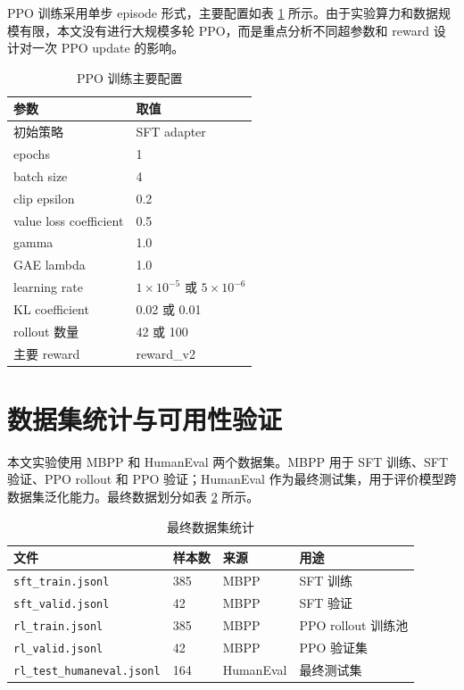 PPO 训练采用单步 episode 形式，主要配置如表 \ref{tab:ppo-config} 所示。由于实验算力和数据规模有限，本文没有进行大规模多轮 PPO，而是重点分析不同超参数和 reward 设计对一次 PPO update 的影响。

\begin{table}[!htp]
  \centering
  \caption{PPO 训练主要配置}
  \label{tab:ppo-config}
  \begin{tabular}{ll}
    \toprule
    参数 & 取值 \\
    \midrule
    初始策略 & SFT adapter \\
    epochs & 1 \\
    batch size & 4 \\
    clip epsilon & 0.2 \\
    value loss coefficient & 0.5 \\
    gamma & 1.0 \\
    GAE lambda & 1.0 \\
    learning rate & $1\times10^{-5}$ 或 $5\times10^{-6}$ \\
    KL coefficient & 0.02 或 0.01 \\
    rollout 数量 & 42 或 100 \\
    主要 reward & reward\_v2 \\
    \bottomrule
  \end{tabular}
\end{table}

\section{数据集统计与可用性验证}

本文实验使用 MBPP 和 HumanEval 两个数据集。MBPP 用于 SFT 训练、SFT 验证、PPO rollout 和 PPO 验证；HumanEval 作为最终测试集，用于评价模型跨数据集泛化能力。最终数据划分如表 \ref{tab:dataset-stat} 所示。

\begin{table}[!htp]
  \centering
  \caption{最终数据集统计}
  \label{tab:dataset-stat}
  \begin{tabular}{llll}
    \toprule
    文件 & 样本数 & 来源 & 用途 \\
    \midrule
    \texttt{sft\_train.jsonl} & 385 & MBPP & SFT 训练 \\
    \texttt{sft\_valid.jsonl} & 42 & MBPP & SFT 验证 \\
    \texttt{rl\_train.jsonl} & 385 & MBPP & PPO rollout 训练池 \\
    \texttt{rl\_valid.jsonl} & 42 & MBPP & PPO 验证集 \\
    \texttt{rl\_test\_humaneval.jsonl} & 164 & HumanEval & 最终测试集 \\
    \bottomrule
  \end{tabular}
\end{table}

